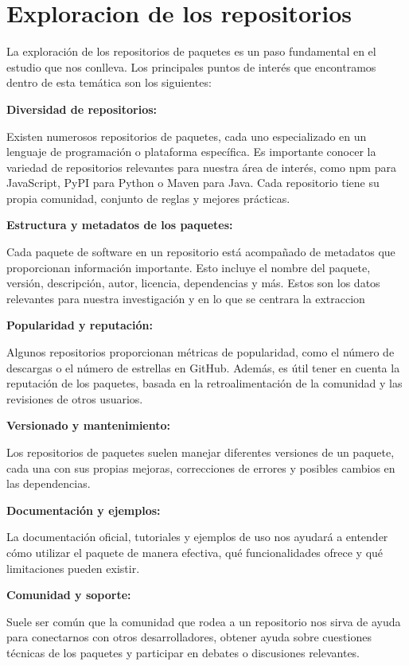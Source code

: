 \section{Exploracion de los repositorios}

La exploración de los repositorios de paquetes es un paso fundamental en el estudio que nos conlleva. Los principales puntos de interés que encontramos dentro de esta temática son los siguientes:

\textbf{Diversidad de repositorios:}

Existen numerosos repositorios de paquetes, cada uno especializado en un lenguaje de programación o plataforma específica. Es importante conocer la variedad de repositorios relevantes para nuestra área de interés, como npm para JavaScript, PyPI para Python o Maven para Java. Cada repositorio tiene su propia comunidad, conjunto de reglas y mejores prácticas.

\textbf{Estructura y metadatos de los paquetes:}

Cada paquete de software en un repositorio está acompañado de metadatos que proporcionan información importante. Esto incluye el nombre del paquete, versión, descripción, autor, licencia, dependencias y más. Estos son los datos relevantes para nuestra investigación y en lo que se centrara la extraccion

\textbf{Popularidad y reputación:}

Algunos repositorios proporcionan métricas de popularidad, como el número de descargas o el número de estrellas en GitHub. Además, es útil tener en cuenta la reputación de los paquetes, basada en la retroalimentación de la comunidad y las revisiones de otros usuarios.

\textbf{Versionado y mantenimiento:}

Los repositorios de paquetes suelen manejar diferentes versiones de un paquete, cada una con sus propias mejoras, correcciones de errores y posibles cambios en las dependencias.

\textbf{Documentación y ejemplos:}

La documentación oficial, tutoriales y ejemplos de uso nos ayudará a entender cómo utilizar el paquete de manera efectiva, qué funcionalidades ofrece y qué limitaciones pueden existir.

\textbf{Comunidad y soporte:}

Suele ser común que la comunidad que rodea a un repositorio nos sirva de ayuda para conectarnos con otros desarrolladores, obtener ayuda sobre cuestiones técnicas de los paquetes y participar en debates o discusiones relevantes. 

